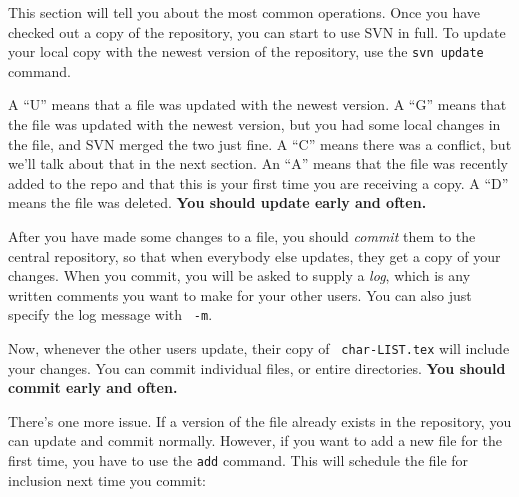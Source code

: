 \documentclass[green]{testgame}
\begin{document}
This section will tell you about the most common operations. Once you
have checked out a copy of the repository, you can start to use SVN in
full. To update your local copy with the newest version of the
repository, use the {\tt svn update} command.


A ``U'' means that a file was updated with the newest version. A ``G''
means that the file was updated with the newest version, but you had
some local changes in the file, and SVN merged the two just fine.  A
``C'' means there was a conflict, but we'll talk about that in the
next section. An ``A'' means that the file was recently added to the
repo and that this is your first time you are receiving a copy. A
``D'' means the file was deleted. {\bf You should update early and
often.}

After you have made some changes to a file, you should {\em commit}
them to the central repository, so that when everybody else updates,
they get a copy of your changes. When you commit, you will be asked to
supply a {\em log}, which is any written comments you want to make for
your other users. You can also just specify the log message with {\tt
-m}.


Now, whenever the other users update, their copy of {\tt
char-LIST.tex} will include your changes. You can commit individual
files, or entire directories. {\bf You should commit early and often.}

There's one more issue. If a version of the file already exists in the
repository, you can update and commit normally. However, if you want
to add a new file for the first time, you have to use the {\tt add}
command. This will schedule the file for inclusion next time you
commit:

\end{document}
